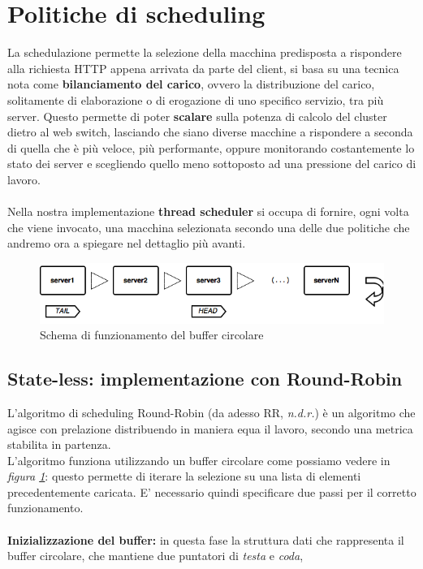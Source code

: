 \documentclass[italian]{tktltiki2}
\begin{document}
\newpage
\section{Politiche di scheduling}
La schedulazione permette la selezione della macchina predisposta a rispondere alla richiesta HTTP appena arrivata da parte del client, si basa su una tecnica nota come \textbf{bilanciamento del carico}, ovvero la distribuzione del carico, solitamente di elaborazione o di erogazione di uno specifico servizio, tra più server. Questo permette di poter \textbf{scalare} sulla potenza di calcolo del cluster dietro al web switch, lasciando che siano diverse macchine a rispondere a seconda di quella che è più veloce, più performante, oppure monitorando costantemente lo stato dei server e scegliendo quello meno sottoposto ad una pressione del carico di lavoro. \\ \\ 
Nella nostra implementazione \textbf{thread scheduler} si occupa di fornire,  ogni volta che viene invocato, una macchina selezionata secondo una delle due politiche che andremo ora a spiegare nel dettaglio più avanti.


\begin{figure}[b]
\centering
\includegraphics[width=\textwidth]{images/rrobin_stateless}
\caption{Schema di funzionamento del buffer circolare \label{fig: rrobin_sl}}
\end{figure}

\subsection{State-less: implementazione con Round-Robin}
L'algoritmo di scheduling Round-Robin (da adesso RR, \emph{n.d.r.}) è un algoritmo che agisce con prelazione distribuendo in maniera equa il lavoro, secondo una metrica stabilita in partenza. \\
L'algoritmo funziona utilizzando un buffer circolare come possiamo vedere in \emph{figura \ref{fig: rrobin_sl}}: questo permette di iterare la selezione su una lista di elementi precedentemente caricata. E' necessario quindi specificare due passi per il corretto funzionamento. \\ \\
\textbf{Inizializzazione del buffer: } in questa fase la struttura dati che rappresenta il buffer circolare, che mantiene due puntatori di \emph{testa} e \emph{coda}, 
\end{document}
